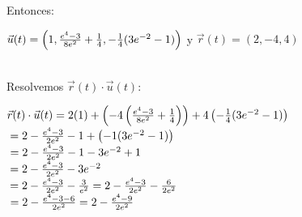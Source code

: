 \documentclass[12pt, letter-paper]{article}
\begin{document}
\begin{enumerate}
\begin{enumerate}
        \normalsize{Entonces:}\par
        $\\\vec{u}(t)=\left(1,\frac{e^{4}-3}{8e^{2}}+\frac{1}{4},-\tfrac{1}{4}(3e^{-2}-1)\right)$\: y\: $\vec{r}(t)=\left( 2,-4,4\right)$\par
        \vspace{0.5cm}
        \\\normalsize{Resolvemos $\vec{r}(t)\cdot\vec{u}(t)$:}\par
        $\\\vec{r}(t)\cdot\vec{u}(t)= 2(1)+\left(-4\left(\frac{e^{4}-3}{8e^{2}}+\frac{1}{4}\right)\right)+4\left(-\tfrac{1}{4}(3e^{-2}-1)\right)$\\
        $\\= 2-\frac{e^{4}-3}{2e^{2}}-1+\left(-1(3e^{-2}-1)\right)$\\
        $\\= 2-\frac{e^{4}-3}{2e^{2}}-1-3e^{-2}+1$\\
        $\\= 2-\frac{e^{4}-3}{2e^{2}}-3e^{-2}$\\
        $\\= 2-\frac{e^{4}-3}{2e^{2}}-\frac{3}{e^{2}} = 2-\frac{e^{4}-3}{2e^{2}}-\frac{6}{2e^{2}}$\\
        $\\= 2-\frac{e^{4}-3-6}{2e^{2}} = 2-\frac{e^{4}-9}{2e^{2}}$\\
        \\\fboxrule=0.5pt 
        
    \end{enumerate}
    \vspace{1.5cm}\par
    

\end{enumerate}
\end{document}
